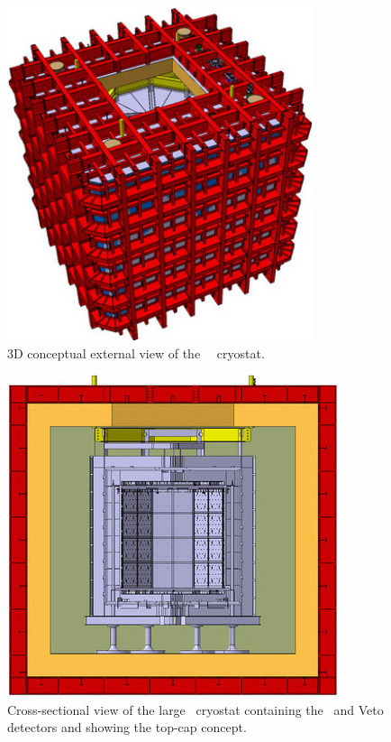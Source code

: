 \begin{figure}[!t]
\includegraphics[width=0.80\textwidth]{./Figures/CryostatExterior.jpeg}
\caption[3D view of the large \AAr\ cryostat]{3D conceptual external view of the \DSks\ \AAr\ cryostat.}
\label{fig:CryostatExternal}
\end{figure}

\begin{figure}[htbp]
\includegraphics[width=\textwidth]{./Figures/Cryostat-InternalAssembly.jpeg}
\caption[Cross-sectional view of the large \AAr\ cryostat]{Cross-sectional view of the large \AAr\ cryostat containing the \LArTPC\ and Veto detectors and showing the top-cap concept.}
\label{fig:CryostatAssembly}
\end{figure}

